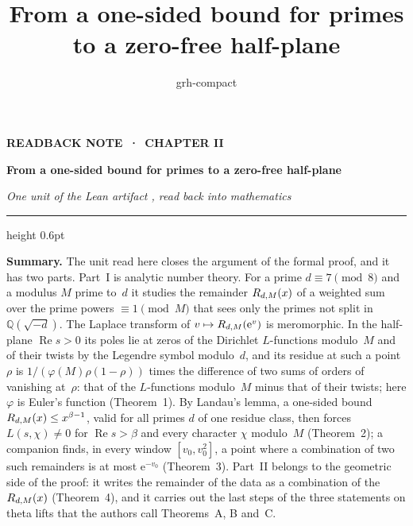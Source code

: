 \documentclass[11pt,a4paper]{article}
\title{From a one-sided bound for primes to a zero-free half-plane}
\author{grh-compact}
\date{}
\newcommand{\Q}{\mathbb{Q}}
\theoremstyle{plainx}
\theoremstyle{uprightx}
\newcommand{\ee}{\mathrm{e}}
\newcommand{\re}{\operatorname{Re}}
\begin{document}
\color{ink}

{\raggedright
{\sffamily\bfseries\fontsize{7.2}{9}\selectfont\color{leancol}READBACK NOTE \,·\, CHAPTER II\par}
\vspace{5pt}
{\fontsize{21.5}{25.5}\selectfont\bfseries From a one-sided bound for primes to a zero-free half-plane\par}
\vspace{5pt}
{\fontsize{12.4}{16}\selectfont\itshape\color{inksoft} One unit of the Lean artifact \ArtifactName, read back into
mathematics\par}}
\vspace{8pt}
{\color{rulegrey}\hrule height 0.6pt}
\vspace{7pt}
\thispagestyle{empty}

\textbf{Summary.} The unit read here closes the argument of the formal proof, and it has two parts. Part~I is analytic
number theory. For a prime $d\equiv 7\pmod 8$ and a modulus $M$ prime to~$d$ it studies the remainder
$R_{d,M}(x)$ of a weighted sum over the prime powers $\equiv 1\pmod M$ that sees only the primes not split in
$\Q(\sqrt{-d})$. The Laplace transform of $v\mapsto\primeError{d}{M}{\ee^{v}}$ is meromorphic. In the half-plane
$\re s>0$ its poles lie at zeros of the Dirichlet $L$-functions modulo~$M$ and of their twists by the Legendre symbol
modulo~$d$, and its residue at such a point~$\rho$ is $1/(\varphi(M)\rho(1-\rho))$ times the difference of two sums
of orders of vanishing at~$\rho$: that of the $L$-functions modulo~$M$ minus that of their twists; here $\varphi$ is
Euler's function (Theorem~1). By Landau's lemma, a one-sided bound
$R_{d,M}(x)\le x^{\beta-1}$, valid for all primes $d$ of one residue class, then forces $L(s,\chi)\ne 0$ for
$\re s>\beta$ and every character $\chi$ modulo~$M$ (Theorem~2); a companion finds, in every window
$[v_0,v_0^{2}]$, a point where a combination of two such remainders is at most $\ee^{-v_0}$ (Theorem~3). Part~II belongs
to the geometric side of the proof: it writes the remainder of the data as a combination of the
$R_{d,M}(x)$ (Theorem~4), and it carries out the last steps of the three statements on theta lifts that the
authors call Theorems~A, B and~C.
\end{document}
